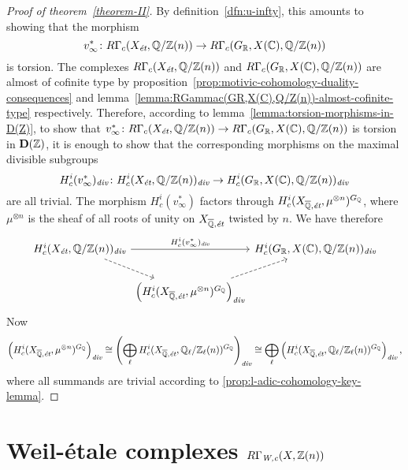 \documentclass{article}
\numberwithin{equation}{section}
\begin{document}
\begin{proof}[Proof of theorem~\ref{theorem-II}]
  By definition~\ref{dfn:u-infty}, this amounts to showing that the morphism
  $$v_\infty^*\colon R\Gamma_c (X_\et, \QQ/\ZZ (n)) \to R\Gamma_c (G_\RR, X (\CC), \QQ/\ZZ (n))$$
  is torsion. The complexes $R\Gamma_c (X_\et, \QQ/\ZZ (n))$ and
  $R\Gamma_c (G_\RR, X (\CC), \QQ/\ZZ (n))$ are almost of cofinite type by
  proposition~\ref{prop:motivic-cohomology-duality-consequences} and
  lemma~\ref{lemma:RGammac(GR,X(C),Q/Z(n))-almost-cofinite-type} respectively.
  Therefore, according to lemma~\ref{lemma:torsion-morphisms-in-D(Z)}, to show that
  $v^*_\infty\colon R\Gamma_c (X_\et, \QQ/\ZZ (n)) \to R\Gamma_c (G_\RR, X
  (\CC), \QQ/\ZZ (n))$ is torsion in $\mathbf{D} (\ZZ)$, it is enough to show
  that the corresponding morphisms on the maximal divisible subgroups
  \[ H^i_c (v^*_\infty)_\div\colon H^i_c (X_\et, \QQ/\ZZ (n))_\div \to
     H^i_c (G_\RR, X (\CC), \QQ/\ZZ (n))_\div \]
  are all trivial. The morphism $H^i_c (v^*_\infty)$ factors through
  $H^i_c (X_{\overline{\QQ}, \text{\it ét}}, \mu^{\otimes n})^{G_\QQ}$, where
  $\mu^{\otimes n}$ is the sheaf of all roots of unity on
  $X_{\overline{\QQ}, \text{\it ét}}$ twisted by $n$.
  We have therefore
  \[ \begin{tikzcd}[column sep=0pt]
    H^i_c (X_\et, \QQ/\ZZ (n))_\div\ar{rr}{H^i_c (v^*_\infty)_\div}\ar[dashed]{dr} && H^i_c (G_\RR, X (\CC), \QQ/\ZZ (n))_\div\\
    & \left(H^i_c (X_{\overline{\QQ}, \text{\it ét}}, \mu^{\otimes n})^{G_\QQ}\right)_\div\ar[dashed]{ur}
  \end{tikzcd} \]
  Now
  \[ \left(H^i_c (X_{\overline{\QQ}, \text{\it ét}}, \mu^{\otimes n})^{G_\QQ}\right)_\div \cong
  \left(\bigoplus_\ell H^i_c (X_{\overline{\QQ}, \text{\it ét}}, \QQ_\ell/\ZZ_\ell (n))^{G_\QQ}\right)_\div \cong
  \bigoplus_\ell \left(H^i_c (X_{\overline{\QQ}, \text{\it ét}}, \QQ_\ell/\ZZ_\ell (n))^{G_\QQ}\right)_\div, \]
  where all summands are trivial according to
  \ref{prop:l-adic-cohomology-key-lemma}.
\end{proof}


\section{Weil-étale complexes \texorpdfstring{$R\Gamma_\Wc (X, \ZZ(n))$}{RΓ\_W,c (X, ℤ(n))}}
\label{sec:RGamma-Wc}
\end{document}
